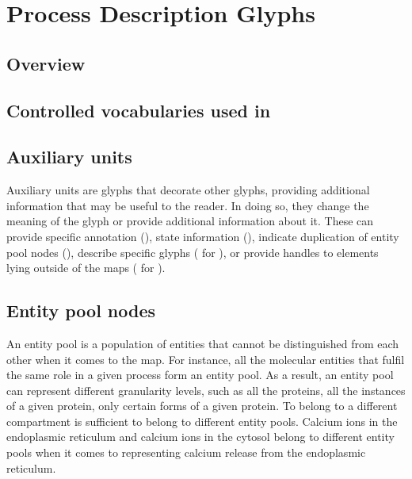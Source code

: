 \chapter{Process Description Glyphs}
\label{chp:glyphs}

\section{Overview}
\label{sec:overview}



\section{Controlled vocabularies used in \SBGNPDLone}\label{sec:CVs}



\section{Auxiliary units}

Auxiliary units are glyphs that decorate other glyphs, providing additional information that may be useful to the reader.
In doing so, they change the meaning of the glyph or provide additional information about it.
These can provide specific annotation (), state information (), indicate duplication of entity pool nodes (), describe specific glyphs ( for ), or provide handles to elements lying outside of the maps ( for ).







\section{Entity pool nodes}\label{sec:EPNs}

An entity pool is a population of entities that cannot be distinguished from each other when it comes to the \SBGNPDLone map.
For instance, all the molecular  entities that fulfil the same role in a given process form an entity pool.
As a result, an entity pool can represent different granularity levels, such as all the proteins, all the instances of a given protein, only certain forms of a given protein.
To belong to a different compartment is sufficient to belong to different entity pools.
Calcium ions in the endoplasmic reticulum and calcium ions in the cytosol belong to different entity pools when it comes to representing calcium release from the endoplasmic reticulum.

